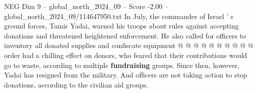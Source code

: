 \begin{textsample}{NEG Dim 9 – global\_north\_2024\_09 – Score -2.00 – global\_north\_2024\_09/114647950.txt}
In July, the commander of Israel ' s ground forces, Tamir Yadai, warned his troops about rules against accepting donations and threatened heightened enforcement.
He also called for officers to inventory all donated supplies and confiscate equipment @ @ @ @ @ @ @ @ @ @ order had a chilling effect on donors, who feared that their contributions would go to waste, according to multiple \textbf{fundraising} groups.
Since then, however, Yadai has resigned from the military.
And officers are not taking action to stop donations, according to the civilian aid groups.

\end{textsample}

